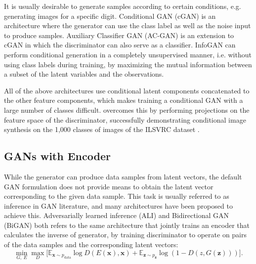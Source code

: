 It is usually desirable to generate samples according to certain conditions, e.g. generating images for a specific digit.
Conditional GAN (cGAN) \cite{mirza2014conditional} is an architecture where the generator can use the class label as well as the noise input to produce samples.
Auxiliary Classifier GAN (AC-GAN) \cite{odena2016acgan} is an extension to cGAN in which the discriminator can also serve as a classifier.
InfoGAN \cite{chen2016infogan} can perform conditional generation in a completely unsupervised manner, i.e. without using class labels during training, by maximizing the mutual information between a subset of the latent variables and the observations.

All of the above architectures use conditional latent components concatenated to the other feature components, which makes training a conditional GAN with a large number of classes difficult.
\cite{miyato2018cgan} overcomes this by performing projections on the feature space of the discriminator, successfully demonstrating conditional image synthesis on the 1,000 classes of images of the ILSVRC dataset \cite{russakovsky2015imagenet}.


\subsection{GANs with Encoder}\label{subsec:gan-encoder}

While the generator can produce data samples from latent vectors, the default GAN formulation does not provide means to obtain the latent vector corresponding to the given data sample.
This task is usually referred to as inference in GAN literature, and many architectures have been proposed to achieve this.
Adversarially learned inference (ALI) \cite{dumoulin2017ali} and Bidirectional GAN (BiGAN) \cite{donahue2016bigan} both refers to the same architecture that jointly trains an encoder that calculates the inverse of generator, by training discriminator to operate on pairs of the data samples and the corresponding latent vectors:
\begin{equation}\label{eqn:bigan}
\min_{G,~E} \max_{D} \Big[ \mathbb{E}_{\bm{x} \sim p_{\mathrm{data}}} {\log D(E(\bm{x}), \bm{x})} + \mathbb{E}_{\bm{z} \sim p_{\bm{z}}} \log \left ( 1 - D(z, G(\bm{z})) \right ) \Big].
\end{equation}

